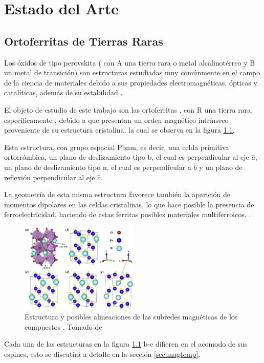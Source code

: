 \documentclass[../main.tex]{subfiles}
\begin{document}
\chapter{Estado del Arte}
\section{Ortoferritas de Tierras Raras}
Los óxidos de tipo perovskita ( con A una tierra rara o metal alcalinotérreo y B un metal de transición) son estructuras estudiadas muy comúnmente en el campo de la ciencia de materiales debido a sus propiedades electromagnéticas, ópticas y catalíticas, además de su estabilidad \cite{Wang2019}.

El objeto de estudio de este trabajo son las ortoferritas , con R una tierra rara, específicamente , debido a que presentan un orden magnético intrínseco proveniente de su estructura cristalina, la cual se observa en la figura \ref{fig:estructuras}. 

Esta estructura, con grupo espacial Pbnm, es decir, una celda primitiva ortorrómbica, un plano de deslizamiento tipo b, el cual es perpendicular al eje $\hat{a}$, un plano de deslizamiento tipo n, el cual es perpendicular a $\hat{b}$ y un plano de reflexión perpendicular al eje $\hat{c}$.

La geometría de esta misma estructura favorece también la aparición de momentos dipolares en las celdas cristalinas, lo que hace posible la presencia de ferroelectricidad, haciendo de estas ferritas posibles materiales multiferroicos. \cite{Sharma2024}.
\begin{figure}[H]
    \centering
    \includegraphics[width=0.5\textwidth]{fig/estructura.jpg}
    \caption{Estructura y posibles alineaciones de las subredes magnéticas de los compuestos . Tomado de \cite{Wang2019}}
    \label{fig:estructuras}
\end{figure}
Cada una de las estructuras en la figura \ref{fig:estructuras} b-e difieren en el acomodo de sus espines, esto se discutirá a detalle en la sección \ref{sec:magtemp}.
\end{document}
